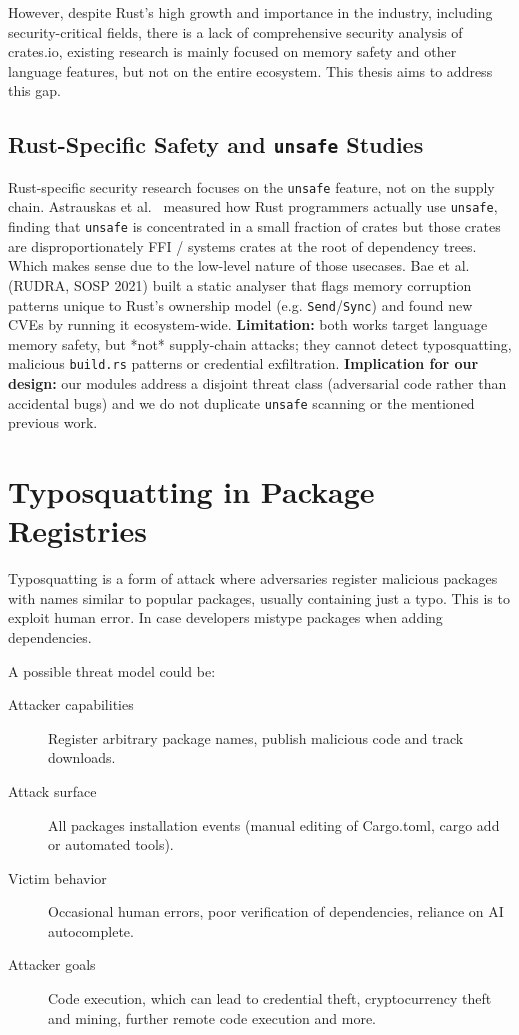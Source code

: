 However, despite Rust's high growth and importance in the industry, including security-critical fields, there is a lack of comprehensive security analysis of crates.io, existing research is mainly focused on memory safety and other language features, but not on the entire ecosystem. This thesis aims to address this gap.

\subsection{Rust-Specific Safety and \texttt{unsafe} Studies}\label{sect:rust-unsafe-studies}

Rust-specific security research focuses on the \texttt{unsafe} feature, not on the supply chain. Astrauskas et al.~\cite{astrauskas2020unsafe} measured how Rust programmers actually use \texttt{unsafe}, finding that \texttt{unsafe} is concentrated in a small fraction of crates but those crates are disproportionately FFI / systems crates at the root of dependency trees. Which makes sense due to the low-level nature of those usecases. Bae et al.~\cite{bae2021rudra} (RUDRA, SOSP 2021) built a static analyser that flags memory corruption patterns unique to Rust's ownership model (e.g. \texttt{Send}/\texttt{Sync}) and found new CVEs by running it ecosystem-wide. \textbf{Limitation:} both works target language memory safety, but *not* supply-chain attacks; they cannot detect typosquatting, malicious \texttt{build.rs} patterns or credential exfiltration. \textbf{Implication for our design:} our modules address a disjoint threat class (adversarial code rather than accidental bugs) and we do not duplicate \texttt{unsafe} scanning or the mentioned previous work.

\section{Typosquatting in Package Registries}\label{sect:typosquatting}

Typosquatting is a form of attack where adversaries register malicious packages with names similar to popular packages, usually containing just a typo. This is to exploit human error. In case developers mistype packages when adding dependencies.

A possible threat model could be:
\begin{description}
	\item[Attacker capabilities] Register arbitrary package names, publish malicious code and track downloads.
	\item[Attack surface] All packages installation events (manual editing of Cargo.toml, cargo add or automated tools).
	\item[Victim behavior] Occasional human errors, poor verification of dependencies, reliance on AI autocomplete.
	\item[Attacker goals] Code execution, which can lead to credential theft, cryptocurrency theft and mining, further remote code execution and more.
\end{description}


